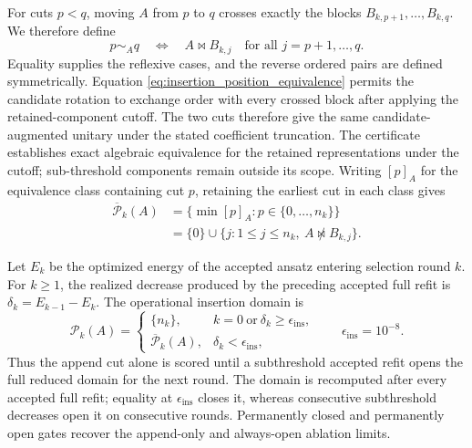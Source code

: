 \documentclass[
  reprint,
  amsmath,
  amssymb,
  aps,
  pra,
  nofootinbib,
  superscriptaddress,
  floatfix
]{revtex4-2}
\begin{document}
For cuts \(p<q\), moving \(A\) from \(p\) to \(q\) crosses exactly the blocks
\(B_{k,p+1},\ldots,B_{k,q}\). We therefore define
\begin{equation}
p\sim_A q
\quad\Longleftrightarrow\quad
A\bowtie B_{k,j}
\quad
\text{for all }j=p+1,\ldots,q.
\label{eq:insertion_position_equivalence}
\end{equation}
Equality supplies the reflexive cases, and the reverse ordered pairs are
defined symmetrically. Equation
\eqref{eq:insertion_position_equivalence} permits the candidate rotation to
exchange order with every crossed block after applying the retained-component
cutoff. The two cuts therefore give the same candidate-augmented unitary under
the stated coefficient truncation. The certificate establishes exact algebraic
equivalence for the retained representations under the cutoff; sub-threshold
components remain outside its scope. Writing \([p]_A\) for the equivalence
class containing cut \(p\), retaining the earliest cut in each class gives
\begin{equation}
\begin{aligned}
\overline{\mathcal P}_k(A)
&=
\{\min [p]_A:p\in\{0,\ldots,n_k\}\}
\\
&=
\{0\}\cup
\{j:1\le j\le n_k,\ A\not\bowtie B_{k,j}\}.
\end{aligned}
\label{eq:commutation_reduced_positions}
\end{equation}

Let \(E_k\) be the optimized energy of the accepted ansatz entering selection
round \(k\). For \(k\ge1\), the realized decrease produced by the preceding
accepted full refit is \(\delta_k=E_{k-1}-E_k\). The operational insertion
domain is
\begin{equation}
\mathcal P_k(A)
=
\begin{cases}
\{n_k\},
& k=0\ \text{or}\ \delta_k\ge\epsilon_{\mathrm{ins}},\\
\overline{\mathcal P}_k(A),
& \delta_k<\epsilon_{\mathrm{ins}},
\end{cases}
\qquad
\epsilon_{\mathrm{ins}}=10^{-8}.
\label{eq:insertion_gate}
\end{equation}
Thus the append cut alone is scored until a subthreshold accepted refit opens
the full reduced domain for the next round. The domain is recomputed after
every accepted full refit; equality at \(\epsilon_{\mathrm{ins}}\) closes it,
whereas consecutive subthreshold decreases open it on consecutive rounds.
Permanently closed and permanently open gates recover the append-only and
always-open ablation limits.
\end{document}
